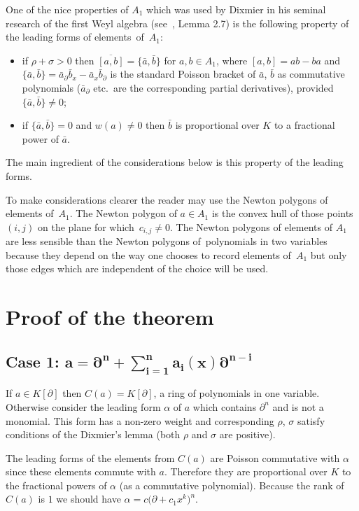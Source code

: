 \documentclass[10pt,a4paper]{amsart}
\numberwithin{equation}{section}
\newcommand{\de}{\partial}
\newcommand{\al}{\alpha}
\newcommand{\si}{\sigma}
\begin{document}
One of the nice properties of $A_1$ which was used by Dixmier in his seminal
research of the first Weyl algebra (see~\cite{D}, Lemma 2.7) is the following property of the leading
forms of ele\-ments~of~$A_1$:
\begin{itemize}\itemsep=0pt
\item if $\rho + \sigma > 0$ then $\overline{[a,b]} = \big\{\bar{a},\bar{b}\big\}$ for $a, b \in
A_1$, where $[a, b] = ab - ba$ and $\big\{\bar{a},\bar{b}\big\} = \bar{a}_{\de}\bar{b}_x
- \bar{a}_x\bar{b}_\de$ is the standard Poisson bracket of $\bar{a}$, $\bar{b}$
as commutative polynomials ($\bar{a}_{\de}$ etc.\ are the corresponding partial
derivatives), provided $\{\bar{a},\bar{b}\} \neq 0$;

\item if $\big\{\bar{a},\bar{b}\big\} = 0$ and $w(a) \ne 0$ then $\bar{b}$ is proportional over $K$ to a fractional power of $\bar{a}$.
\end{itemize}

The main ingredient of the considerations below is this property of the leading
forms.

To make considerations clearer the reader may use the Newton polygons of elements of~$A_1$.
The Newton polygon of $a \in A_1$ is the convex hull of those points $(i, j)$ on the plane for which~$c_{i,j} \neq 0$. The Newton polygons of elements
of $A_1$ are less sensible than the Newton polygons of~polynomials in two
variables because they depend on the way one chooses to record elements of~$A_1$
but only those edges which are independent of the choice will be used.


\section{Proof of the theorem}\label{pcp}

\subsection*{Case 1:
$\boldsymbol{\displaystyle a = \de^n + \sum\limits_{i=1}^n a_i(x)\de^{n-i}}$}

If $a \in K[\de]$ then $C(a) = K[\de]$, a ring of polynomials in one variable. Otherwise consider the leading form $\alpha$ of $a$ which contains $\de^n$ and is not a
monomial. This form has a non-zero weight and corresponding $\rho$, $\sigma$ satisfy conditions of the Dixmier's lemma (both $\rho$ and $\si$ are positive).

The leading forms of the elements from $C(a)$ are Poisson commutative with $\al$ since these elements commute with $a$. Therefore
they are proportional over $K$ to the fractional powers of $\alpha$ (as a
commutative polynomial). Because the rank of $C(a)$ is $1$ we should have $\alpha = c\big(\de + c_1x^k\big)^n$.
\end{document}
